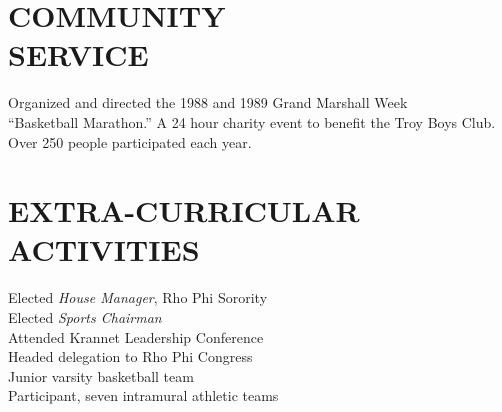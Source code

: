 \documentclass[margin, 10pt]{res} %
\begin{document}
\begin{resume}
\section{COMMUNITY \\ SERVICE}

Organized and directed the 1988 and 1989 Grand Marshall Week \\
``Basketball Marathon.'' A 24 hour charity event to benefit the Troy Boys Club. Over 250 people participated each year. 


\section{EXTRA-CURRICULAR \\ ACTIVITIES} 

Elected {\it House Manager}, Rho Phi Sorority \\
Elected {\it Sports Chairman} \\
Attended Krannet Leadership Conference \\
Headed delegation to Rho Phi Congress \\
Junior varsity basketball team \\
Participant, seven intramural athletic teams 


\end{resume}
\end{document}
